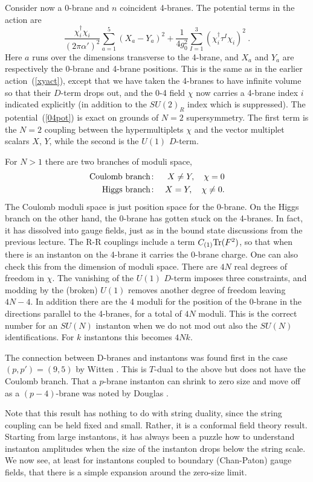 \documentclass[12pt]{article}
\def\be{\begin{equation}}
\def\ee{\end{equation}}
\def\bea{\begin{eqnarray}}
\def\eea{\end{eqnarray}}
\def\apm{\alpha'}
\begin{document}
Consider now a 0-brane and $n$ coincident 4-branes.  The potential terms in
the action are
\be
\frac{ \chi_i^{\dagger} \chi_i }{(2\pi\apm)^2 }
\sum_{a=1}^{5} ( X_a - Y_a )^2 + \frac{1}{4g_0^2}
\sum_{I=1}^3 (\chi_i^{\dagger}\tau^I\chi_i)^2 \ .
\label{04pot}
\ee
Here $a$ runs over the dimensions transverse to the 4-brane, and $X_a$ and
$Y_a$ are respectively the 0-brane and 4-brane positions.   This is the same
as in the earlier action~(\ref{xyact}), except that we have taken the
4-branes to have infinite volume so that their
$D$-term drops out, and the 0-4 field $\chi$ now carries a 4-brane index
$i$ indicated explicitly (in addition to the $SU(2)_R$ index which is
suppressed).  The potential~(\ref{04pot}) is exact on grounds of $N=2$
supersymmetry.  The first term is the $N=2$ coupling between the
hypermultiplets $\chi$ and the vector multiplet scalars $X$, $Y$, while
the second is the $U(1)$ $D$-term.

For $N > 1$ there are two branches of moduli space,
\bea
{\rm Coulomb\ branch\colon}&& X \neq Y, \quad \chi = 0\nonumber\\
{\rm Higgs\ branch\colon}&& X = Y, \quad \chi \neq 0.
\eea
The Coulomb moduli space is just position space for the 0-brane.
On the Higgs branch on the other hand, the 0-brane has gotten stuck on the
4-branes.  In fact, it has dissolved into gauge fields, just as in the
bound state discussions from the previous lecture.  The R-R couplings
include a term $C_{(1)} {\rm Tr}(F^2)$, so that when there is an instanton on
the 4-brane it carries the 0-brane charge.  One can also check this from
the dimension of moduli space.  There are $4N$ real degrees of freedom in
$\chi$.  The vanishing of the $U(1)$ $D$-term imposes three constraints,
and modding by the (broken) $U(1)$ removes another degree of freedom
leaving $4N - 4$.  In addition there are the 4 moduli for the position of the
0-brane in the directions parallel to the 4-branes, for a total of $4N$
moduli.  This is the correct number for an $SU(N)$ instanton when we do not
mod out also the $SU(N)$ identifications.  For $k$ instantons this becomes
$4Nk$.

The connection between D-branes and instantons was found first in the case
$(p,p') = (9,5)$ by Witten \cite{witinst}.  This is $T$-dual to the above but
does not have the Coulomb branch.  That a $p$-brane instanton can shrink to
zero size and move off as a $(p-4)$-brane was noted by
Douglas \cite{douginst}.

Note that this result has nothing to do with string duality, since the
string coupling can be held fixed and small.  Rather, it is a conformal
field theory result.  Starting from large instantons, it has
always been a puzzle how to understand instanton amplitudes when the size
of the instanton drops below the string scale.  We now see, at least for
instantons coupled to boundary (Chan-Paton) gauge fields, that there is a
simple expansion around the zero-size limit.
\end{document}
